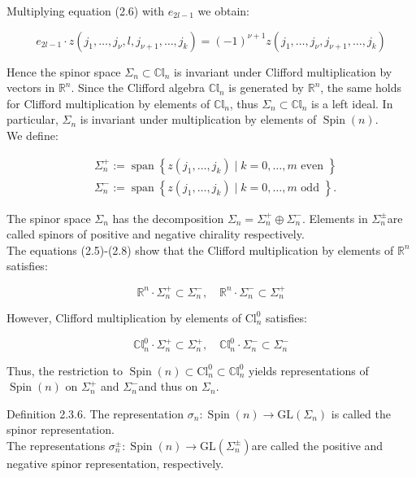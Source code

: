 \documentclass[10pt, letterpaper]{article}
\begin{document}
Multiplying equation (2.6) with $e_{2 l-1}$ we obtain:

$$
e_{2 l-1} \cdot z\left(j_{1}, \ldots, j_{\nu}, l, j_{\nu+1}, \ldots, j_{k}\right)=(-1)^{\nu+1} z\left(j_{1}, \ldots, j_{\nu}, j_{\nu+1}, \ldots, j_{k}\right)
$$

Hence the spinor space $\Sigma_{n} \subset \mathbb{C l}_{n}$ is invariant under Clifford multiplication by vectors in $\mathbb{R}^{n}$. Since the Clifford algebra $\mathbb{C l}_{n}$ is generated by $\mathbb{R}^{n}$, the same holds for Clifford multiplication by elements of $\mathbb{C l}_{n}$, thus $\Sigma_{n} \subset \mathbb{C l}_{n}$ is a left ideal. In particular, $\Sigma_{n}$ is invariant under multiplication by elements of $\operatorname{Spin}(n)$.\\
We define:

$$
\begin{aligned}
& \Sigma_{n}^{+}:=\operatorname{span}\left\{z\left(j_{1}, \ldots, j_{k}\right) \mid k=0, \ldots, m \text { even }\right\} \\
& \Sigma_{n}^{-}:=\operatorname{span}\left\{z\left(j_{1}, \ldots, j_{k}\right) \mid k=0, \ldots, m \text { odd }\right\} .
\end{aligned}
$$

The spinor space $\Sigma_{n}$ has the decomposition $\Sigma_{n}=\Sigma_{n}^{+} \oplus \Sigma_{n}^{-}$. Elements in $\Sigma_{n}^{ \pm}$are called spinors of positive and negative chirality respectively.\\
The equations (2.5)-(2.8) show that the Clifford multiplication by elements of $\mathbb{R}^{n}$ satisfies:

$$
\mathbb{R}^{n} \cdot \Sigma_{n}^{+} \subset \Sigma_{n}^{-}, \quad \mathbb{R}^{n} \cdot \Sigma_{n}^{-} \subset \Sigma_{n}^{+}
$$

However, Clifford multiplication by elements of $\mathrm{Cl}_{n}^{0}$ satisfies:

$$
\mathbb{C l}_{n}^{0} \cdot \Sigma_{n}^{+} \subset \Sigma_{n}^{+}, \quad \mathbb{C l}_{n}^{0} \cdot \Sigma_{n}^{-} \subset \Sigma_{n}^{-}
$$

Thus, the restriction to $\operatorname{Spin}(n) \subset \mathrm{Cl}_{n}^{0} \subset \mathbb{C l}_{n}^{0}$ yields representations of $\operatorname{Spin}(n)$ on $\Sigma_{n}^{+}$ and $\Sigma_{n}^{-}$and thus on $\Sigma_{n}$.

Definition 2.3.6. The representation $\sigma_{n}: \operatorname{Spin}(n) \rightarrow \mathrm{GL}\left(\Sigma_{n}\right)$ is called the spinor representation.\\
The representations $\sigma_{n}^{ \pm}: \operatorname{Spin}(n) \rightarrow \mathrm{GL}\left(\Sigma_{n}^{ \pm}\right)$are called the positive and negative spinor representation, respectively.
\end{document}
